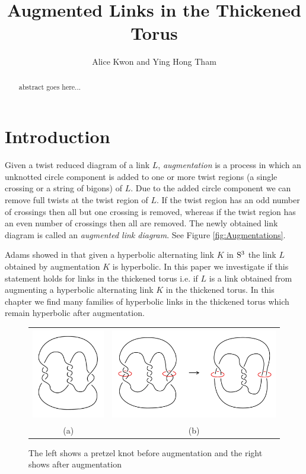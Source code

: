 \documentclass[11pt]{amsart}
\title [Augmented Links in the Thickened Torus] {Augmented Links in the Thickened Torus}
\author[Alice Kwon and Ying Hong Tham]{Alice Kwon and Ying Hong Tham}
\newcommand{\Sp}{\rm{S}}
\theoremstyle{plain}
\theoremstyle{definition}
\begin{document}
\maketitle

\begin{abstract}
  abstract goes here...
\end{abstract}

\section{Introduction}

Given a twist reduced diagram of a link $L$, {\it augmentation} is a process in which an unknotted circle component is added to one or more twist regions (a single crossing or a string of bigons) of $L$. Due to the added circle component we can remove full twists at the twist region of $L$. If the twist region has an odd number of crossings then all but one crossing is removed, whereas if the twist region has an even number of crossings then all are removed. The newly obtained link diagram is called an {\it augmented link diagram}. See Figure \ref{fig:Augmentations}.

Adams showed in \cite{CA} that given a hyperbolic alternating link $K$ in $\Sp^3$ the link $L$ obtained by augmentation $K$ is hyperbolic. In this paper we investigate if this statement holds for links in the thickened torus i.e. if $L$ is a link obtained from augmenting a hyperbolic alternating link $K$ in the thickened torus. In this chapter we find many families of hyperbolic links in the thickened torus which remain hyperbolic after augmentation. 

 \begin{figure}
 \centering  
 \begin{tabular}{cc}
 \includegraphics [height=4cm]{augmentation1}&
  \includegraphics [height=4cm]{augmentation2}\\
  (a)&(b)
  \end{tabular}
 \caption{The left shows a pretzel knot before augmentation and the right shows after augmentation}
 \label{fig:augmentationS3}
 \end{figure}
 
\end{document}
